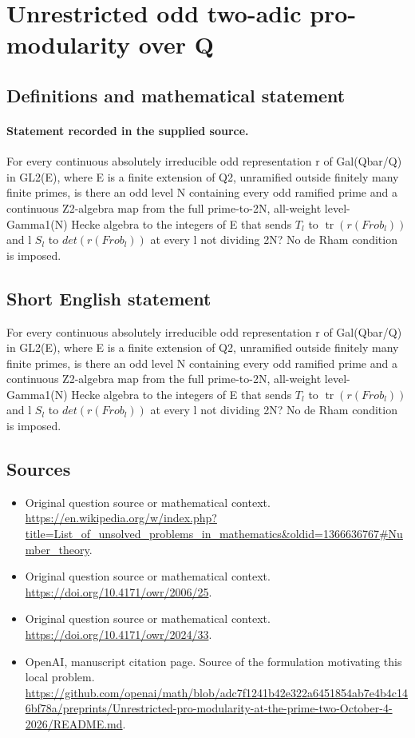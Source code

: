\documentclass[11pt]{article}
\begin{document}
\section*{Unrestricted odd two-adic pro-modularity over Q}\label{30007288}
\subsection{Definitions and mathematical statement}
\paragraph{Statement recorded in the supplied source.}
For every continuous absolutely irreducible odd representation r of Gal(Qbar/Q) in GL2(E), where E is a finite extension of Q2, unramified outside finitely many finite primes, is there an odd level N containing every odd ramified prime and a continuous Z2-algebra map from the full prime-to-2N, all-weight level-Gamma1(N) Hecke algebra to the integers of E that sends $T_l$ to $\operatorname{tr}(r(Frob_l))$ and l $S_l$ to $det(r(Frob_l))$ at every l not dividing 2N? No de Rham condition is imposed.
\subsection{Short English statement}
For every continuous absolutely irreducible odd representation r of Gal(Qbar/Q) in GL2(E), where E is a finite extension of Q2, unramified outside finitely many finite primes, is there an odd level N containing every odd ramified prime and a continuous Z2-algebra map from the full prime-to-2N, all-weight level-Gamma1(N) Hecke algebra to the integers of E that sends $T_l$ to $\operatorname{tr}(r(Frob_l))$ and l $S_l$ to $det(r(Frob_l))$ at every l not dividing 2N? No de Rham condition is imposed.
\subsection{Sources}
\begin{itemize}
\item[S1] Original question source or mathematical context.
\url{https://en.wikipedia.org/w/index.php?title=List_of_unsolved_problems_in_mathematics&oldid=1366636767#Number_theory}.
\item[S2] Original question source or mathematical context.
\url{https://doi.org/10.4171/owr/2006/25}.
\item[S3] Original question source or mathematical context.
\url{https://doi.org/10.4171/owr/2024/33}.
\item[S4] OpenAI, manuscript citation page. Source of the formulation motivating this local problem.
\url{https://github.com/openai/math/blob/adc7f1241b42e322a6451854ab7e4b4c146bf78a/preprints/Unrestricted-pro-modularity-at-the-prime-two-October-4-2026/README.md}.
\end{itemize}
\end{document}
